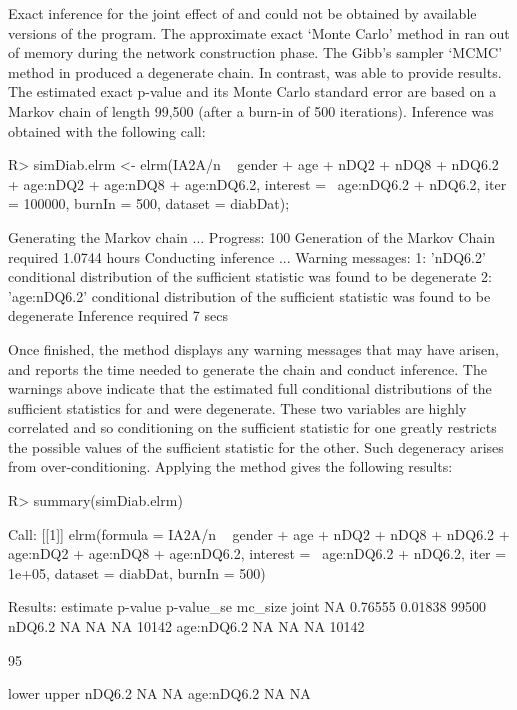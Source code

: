 \documentclass[article, shortnames]{jss}
\begin{document}
Exact inference for the joint effect of  and
 could not be obtained by available versions of
the  program. The approximate exact `Monte Carlo'
method in  ran out of memory during the network
construction phase. The Gibb's sampler `MCMC' method in
 produced a degenerate chain. In contrast, 
was able to provide results. The estimated exact p-value and its
Monte Carlo standard error are based on a Markov chain of length
99,500 (after a burn-in of 500 iterations). Inference was obtained
with the following call:
\begin{CodeChunk}
\begin{CodeInput}
R> simDiab.elrm <- elrm(IA2A/n ~ gender + age + nDQ2 + nDQ8 + nDQ6.2 +
age:nDQ2 + age:nDQ8 + age:nDQ6.2, interest = ~age:nDQ6.2 + nDQ6.2,
iter = 100000, burnIn = 500, dataset = diabDat);
\end{CodeInput}
\begin{CodeOutput}
Generating the Markov chain ...
Progress: 100%
Generation of the Markov Chain required 1.0744 hours
Conducting inference ...
Warning messages:
1: 'nDQ6.2' conditional distribution of the sufficient statistic was found to
be degenerate
2: 'age:nDQ6.2' conditional distribution of the sufficient statistic was found
to be degenerate
Inference required 7 secs
\end{CodeOutput}
\end{CodeChunk}
Once finished, the  method displays any warning
messages that may have arisen, and reports the time needed to
generate the chain and conduct inference. The warnings above
indicate that the estimated full conditional distributions of the
sufficient statistics for  and  were
degenerate. These two variables are highly correlated and so
conditioning on the sufficient statistic for one greatly restricts
the possible values of the sufficient statistic for the other.
Such degeneracy arises from over-conditioning. Applying the
 method gives the following results:
\begin{CodeChunk}
\begin{CodeInput}
R> summary(simDiab.elrm)
\end{CodeInput}
\begin{CodeOutput}
Call:
[[1]]
elrm(formula = IA2A/n ~ gender + age + nDQ2 + nDQ8 + nDQ6.2 +
    age:nDQ2 + age:nDQ8 + age:nDQ6.2, interest = ~age:nDQ6.2 +
    nDQ6.2, iter = 1e+05, dataset = diabDat, burnIn = 500)

Results:
           estimate p-value p-value_se mc_size
joint            NA 0.76555    0.01838   99500
nDQ6.2           NA      NA         NA   10142
age:nDQ6.2       NA      NA         NA   10142

95%

           lower upper
nDQ6.2        NA    NA
age:nDQ6.2    NA    NA
\end{CodeOutput}
\end{CodeChunk}
\end{document}
